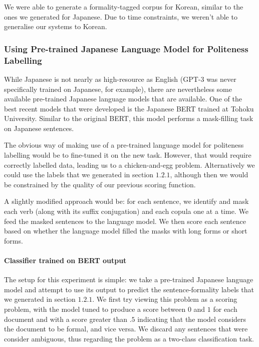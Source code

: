 \documentclass[11pt]{article}
\begin{document}
We were able to generate a formality-tagged corpus for Korean, similar to the ones we generated for Japanese. Due to time constraints, we weren't able to generalise our systems to Korean.

\subsubsection{Using Pre-trained Japanese Language Model for Politeness Labelling}

While Japanese is not nearly as high-resource as English (GPT-3 was never specifically trained on Japanese, for example), there are nevertheless some available pre-trained Japanese language models that are available. One of the best recent models that were developed is the Japanese BERT trained at Tohoku University. Similar to the original BERT, this model performs a mask-filling task on Japanese sentences. 

The obvious way of making use of a pre-trained language model for politeness labelling would be to fine-tuned it on the new task. However, that would require correctly labelled data, leading us to a chicken-and-egg problem. Alternatively we could use the labels that we generated in section $1.2.1$, although then we would be constrained by the quality of our previous scoring function.

A slightly modified approach would be: for each sentence, we identify and mask each verb (along with its suffix conjugation) and each copula one at a time. We feed the masked sentences to the language model. We then score each sentence based on whether the language model filled the masks with long forms or short forms.

\paragraph{Classifier trained on BERT output}

The setup for this experiment is simple: we take a pre-trained Japanese language model and attempt to use its output to predict the sentence-formality labels that we generated in section $1.2.1$. We first try viewing this problem as a scoring problem, with the model tuned to produce a score between $0$ and $1$ for each document and with a score greater than $.5$ indicating that the model considers the document to be formal, and vice versa. We discard any sentences that were consider ambiguous, thus regarding the problem as a two-class classification task. 
\end{document}
